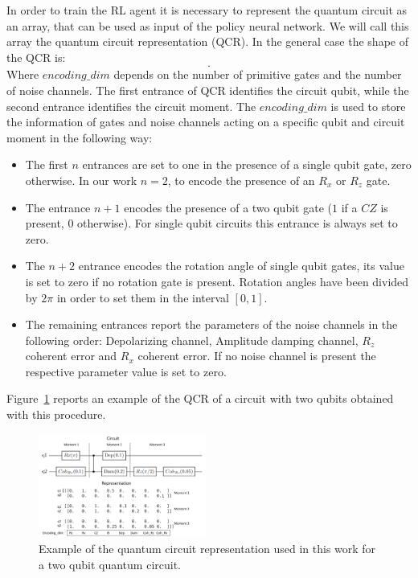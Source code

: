 \documentclass[referee,sn-basic]{sn-jnl} %
\begin{document}
\noindent
In order to train the RL agent it is necessary to represent the quantum circuit as an array, that can be used as input of the policy neural network. We will call this array the quantum circuit representation (QCR). 
In the general case the shape of the QCR is:
\begin{equation*}
    [ \, qubits, \: depth, \:  encoding\_dim \, ].
\end{equation*}
Where $encoding\_dim$ depends on the number of primitive gates and the number of noise channels. 
The first entrance of QCR identifies the circuit qubit, while the second entrance identifies the circuit moment.
The $encoding\_dim$ is used to store the information of gates and noise channels acting on a specific qubit and circuit moment in the following way:
\begin{itemize}
    \item The first $n$ entrances are set to one in the presence of a single qubit gate, zero otherwise. In our work $n=2$, to encode the presence of an $R_x$ or $R_z$ gate.
    \item The entrance $n+1$ encodes the presence of a two qubit gate ($1$ if a $CZ$ is present, $0$ otherwise). For single qubit circuits this entrance is always set to zero.
    \item The $n+2$ entrance encodes the rotation angle of single qubit gates, its value is set to zero if no rotation gate is present. Rotation angles have been divided by $2\pi$ in order to set them in the interval $[0,1]$.
    \item The remaining entrances report the parameters of the noise channels in the following order: Depolarizing channel, Amplitude damping channel, $R_z$ coherent error and $R_x$ coherent error. If no noise channel is present the respective parameter value is set to zero. 
\end{itemize}
Figure~\ref{fig_qcr} reports an example of the QCR of a circuit with two qubits obtained with this procedure.
\begin{figure}
    \centering
    \includegraphics[width=0.49\textwidth]{circuit_representation.png}
    \caption{Example of the quantum circuit representation used in this work for a two qubit quantum circuit. }\label{fig_qcr}
\end{figure}
\end{document}
